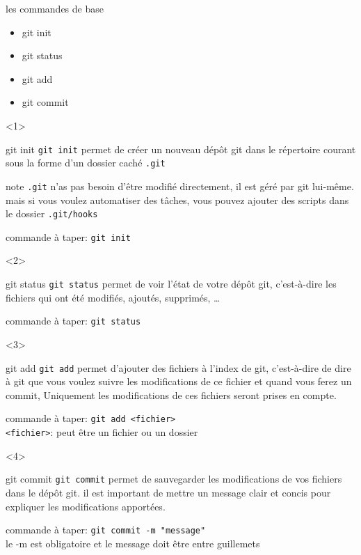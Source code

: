 \documentclass[usenames,dvipsnames]{beamer}
\begin{document}
\begin{frame}[fragile]{les commandes de base}
	\begin{itemize}
		\item<1-4> git init
		\item <2-4> git status
		\item <3-4> git add
		\item <4-4> git commit
	\end{itemize}

	\begin{onlyenv}
		\begin{block}{git init}
			\texttt{git init} permet de créer un nouveau dépôt git dans le répertoire courant sous la forme d'un dossier caché \texttt{.git}
		\end{block}

		\begin{block}{note}
			\texttt{.git} n'as pas besoin d'être modifié directement, il est géré par git lui-même. mais si vous voulez automatiser des tâches, vous pouvez ajouter des scripts dans le dossier \texttt{.git/hooks}
		\end{block}

		commande à taper: \lstinline|git init|
	\end{onlyenv}

	\begin{onlyenv}
		\begin{block}{git status}
			\texttt{git status} permet de voir l'état de votre dépôt git, c'est-à-dire les fichiers qui ont été modifiés, ajoutés, supprimés, \dots
		\end{block}

		commande à taper: \lstinline|git status|
	\end{onlyenv}

	\begin{onlyenv}
		\begin{block}{git add}
			\texttt{git add} permet d'ajouter des fichiers à l'index de git, c'est-à-dire de dire à git que vous voulez suivre les modifications de ce fichier et %
			quand vous ferez un commit, 
			\color{red}
			Uniquement
			\color{black}
			les modifications de ces fichiers seront prises en compte.
		\end{block}

		commande à taper: \lstinline|git add <fichier>| \\
		
		\texttt{<fichier>}: peut être un fichier ou un dossier
	\end{onlyenv}

	\begin{onlyenv}
		\begin{block}{git commit}
			\texttt{git commit} permet de sauvegarder les modifications de vos fichiers dans le dépôt git. il est important de mettre un message clair et concis pour expliquer les modifications apportées.
		\end{block}

		commande à taper: \lstinline|git commit -m "message"| \\
		le -m est obligatoire et le message doit être entre guillemets
	\end{onlyenv}
\end{frame}
\end{document}

